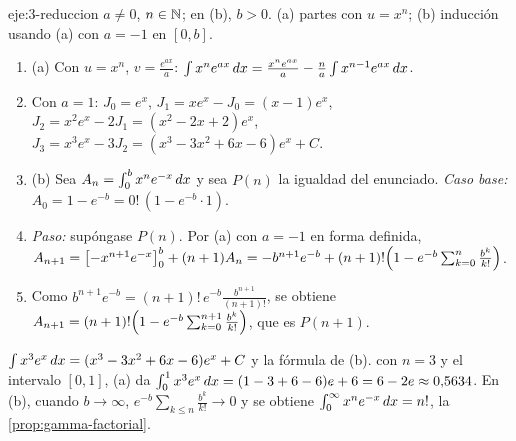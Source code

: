 \begin{solucion}{eje:3-reduccion}
\datos $a\neq0$, $n\in\mathbb{N}$; en (b), $b>0$.
\planteamiento (a) partes con $u=x^{n}$; (b) inducción usando (a) con $a=-1$ en $[0,b]$.
\pasos
\begin{enumerate}[label=\arabic*.]
  \item (a) Con $u=x^{n}$, $v=\frac{e^{ax}}{a}$: $\int x^{n}e^{ax}\mathop{}\!d x=\frac{x^{n}e^{ax}}{a}-\frac na\int x^{n-1}e^{ax}\mathop{}\!d x$.
  \item Con $a=1$: $J_0=e^{x}$, $J_1=xe^{x}-J_0=(x-1)e^{x}$, $J_2=x^{2}e^{x}-2J_1=(x^{2}-2x+2)e^{x}$, $J_3=x^{3}e^{x}-3J_2=(x^{3}-3x^{2}+6x-6)e^{x}+C$.
  \item (b) Sea $A_n=\int_0^{b}x^{n}e^{-x}\mathop{}\!d x$ y sea $P(n)$ la igualdad del enunciado. \emph{Caso base:} $A_0=1-e^{-b}=0!\,(1-e^{-b}\cdot1)$.
  \item \emph{Paso:} supóngase $P(n)$. Por (a) con $a=-1$ en forma definida, $A_{n+1}=\bigl[-x^{n+1}e^{-x}\bigr]_{0}^{b}+(n+1)A_n=-b^{n+1}e^{-b}+(n+1)!\Bigl(1-e^{-b}\sum_{k=0}^{n}\frac{b^{k}}{k!}\Bigr)$.
  \item Como $b^{n+1}e^{-b}=(n+1)!\,e^{-b}\frac{b^{n+1}}{(n+1)!}$, se obtiene $A_{n+1}=(n+1)!\Bigl(1-e^{-b}\sum_{k=0}^{n+1}\frac{b^{k}}{k!}\Bigr)$, que es $P(n+1)$.
\end{enumerate}
\resultado $\int x^{3}e^{x}\mathop{}\!d x=(x^{3}-3x^{2}+6x-6)e^{x}+C$ y la fórmula de (b).
\comprobacion con $n=3$ y el intervalo $[0,1]$, (a) da $\int_0^{1}x^{3}e^{x}\mathop{}\!d x=(1-3+6-6)e+6=6-2e\approx0{,}5634$. En (b), cuando $b\to\infty$, $e^{-b}\sum_{k\le n}\frac{b^{k}}{k!}\to0$ y se obtiene $\int_0^{\infty}x^{n}e^{-x}\mathop{}\!d x=n!$, la \cref{prop:gamma-factorial}.
\end{solucion}

